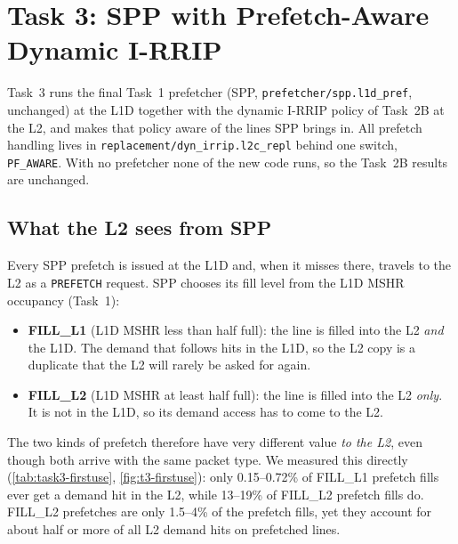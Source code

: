 \section{Task 3: SPP with Prefetch-Aware Dynamic I-RRIP}\label{sec:task3}

Task~3 runs the final Task~1 prefetcher (SPP, \texttt{prefetcher/spp.l1d\_pref}, unchanged) at the L1D
together with the dynamic I-RRIP policy of Task~2B at the L2, and makes that policy aware of the
lines SPP brings in. All prefetch handling lives in \texttt{replacement/dyn\_irrip.l2c\_repl} behind one
switch, \texttt{PF\_AWARE}. With no prefetcher none of the new code runs, so the Task~2B results are
unchanged.

\subsection{What the L2 sees from SPP}\label{sec:task3-l2view}

Every SPP prefetch is issued at the L1D and, when it misses there, travels to the L2 as a
\texttt{PREFETCH} request. SPP chooses its fill level from the L1D MSHR occupancy (Task~1):
\begin{itemize}[nosep]
  \item \textbf{FILL\_L1} (L1D MSHR less than half full): the line is filled into the L2 \emph{and} the L1D.
        The demand that follows hits in the L1D, so the L2 copy is a duplicate that the L2 will
        rarely be asked for again.
  \item \textbf{FILL\_L2} (L1D MSHR at least half full): the line is filled into the L2 \emph{only}.
        It is not in the L1D, so its demand access has to come to the L2.
\end{itemize}
The two kinds of prefetch therefore have very different value \emph{to the L2}, even though both
arrive with the same packet type. We measured this directly (\cref{tab:task3-firstuse},
\cref{fig:t3-firstuse}): only 0.15--0.72\% of FILL\_L1 prefetch fills ever get a demand hit in the L2,
while 13--19\% of FILL\_L2 prefetch fills do. FILL\_L2 prefetches are only 1.5--4\% of the prefetch fills,
yet they account for about half or more of all L2 demand hits on prefetched lines.

